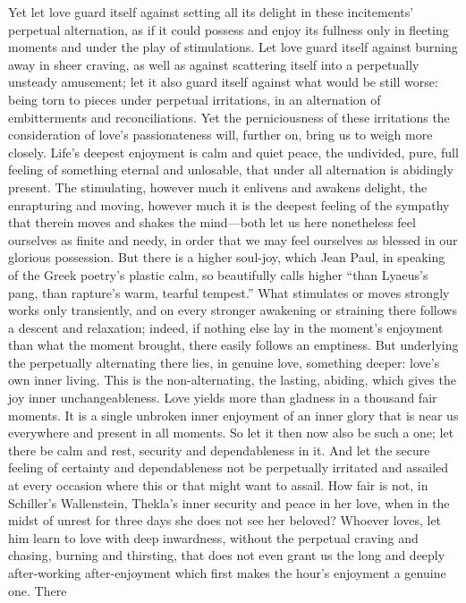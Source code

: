 \documentclass[12pt,a4paper]{book}
\begin{document}
Yet let love guard itself against setting all its delight in these
incitements' perpetual alternation, as if it could possess and enjoy its
fullness only in fleeting moments and under the play of stimulations. Let
love guard itself against burning away in sheer craving, as well as against
scattering itself into a perpetually unsteady amusement; let it also guard
itself against what would be still worse: being torn to pieces under
perpetual irritations, in an alternation of embitterments and
reconciliations. Yet the perniciousness of these irritations the
consideration of love's passionateness will, further on, bring us to weigh
more closely. Life's deepest enjoyment is calm and quiet peace, the
undivided, pure, full feeling of something eternal and unlosable, that
under all alternation is abidingly present. The stimulating, however much it
enlivens and awakens delight, the enrapturing and moving, however much it is
the deepest feeling of the sympathy that therein moves and shakes the
mind---both let us here nonetheless feel ourselves as finite and needy, in
order that we may feel ourselves as blessed in our glorious possession. But
there is a higher soul-joy, which Jean Paul, in speaking of the Greek
poetry's plastic calm, so beautifully calls higher ``than Lyaeus's pang,
than rapture's warm, tearful tempest.'' What stimulates or moves strongly
works only transiently, and on every stronger awakening or straining there
follows a descent and relaxation; indeed, if nothing else lay in the
moment's enjoyment than what the moment brought, there easily follows an
emptiness. But underlying the perpetually alternating there lies, in genuine
love, something deeper: love's own inner living. This is the
non-alternating, the lasting, abiding, which gives the joy inner
unchangeableness. Love yields more than gladness in a thousand fair moments.
It is a single unbroken inner enjoyment of an inner glory that is near us
everywhere and present in all moments. So let it then now also be such a
one; let there be calm and rest, security and dependableness in it. And let
the secure feeling of certainty and dependableness not be perpetually
irritated and assailed at every occasion where this or that might want to
assail. How fair is not, in Schiller's Wallenstein, Thekla's inner security
and peace in her love, when in the midst of unrest for three days she does
not see her beloved? Whoever loves, let him learn to love with deep
inwardness, without the perpetual craving and chasing, burning and
thirsting, that does not even grant us the long and deeply after-working
after-enjoyment which first makes the hour's enjoyment a genuine one. There
\end{document}
